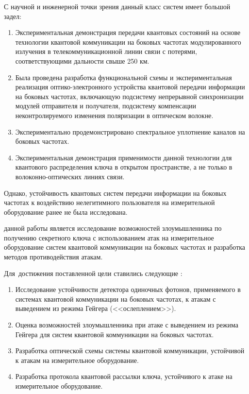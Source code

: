 С научной и инженерной точки зрения данный класс систем имеет большой задел:

\begin{enumerate}
	\item Экспериментальная демонстрация передачи квантовых состояний на основе технологии квантовой коммуникации на боковых частотах модулированного излучения в телекоммуникационной линии связи с потерями, соответствующими дальности свыше 250 км. 
	\item Была проведена разработка функциональной схемы и экспериментальная реализация оптико-электронного устройства квантовой передачи информации на боковых частотах, включающую подсистему непрерывной синхронизации модулей отправителя и получателя, подсистему компенсации неконтролируемого изменения поляризации в оптическом волокне.
	\item Экспериментально продемонстрировано спектральное уплотнение каналов на боковых частотах. 
	\item Экспериментальная демонстрация применимости данной технологии для квантового распределения ключа в открытом пространстве, а не только в волоконно-оптических линиях связи. 
\end{enumerate}


Однако, устойчивость квантовых систем передачи информации на боковых частотах к воздействию нелегитимного пользователя на измерительной оборудование ранее не была исследована. 


{\aim} данной работы является исследование возможностей злоумышленника по получению секретного ключа с использованием атак на измерительное оборудование систем квантовой коммуникации на боковых частотах и разработка методов противодействия атакам.


Для~достижения поставленной цели ставились следующие {\tasks}:
\begin{enumerate}
  \item Исследование устойчивости детектора одиночных фотонов, применяемого в системах квантовой коммуникации на боковых частотах, к атакам с выведением из режима Гейгера (<<ослеплением>>). 

  \item Оценка возможностей злоумышленника при атаке с выведением из режима Гейгера для систем квантовой коммуникации на боковых частотах. 

  \item Разработка оптической схемы системы квантовой коммуникации, устойчивой к атакам на измерительное оборудование. 

  \item Разработка протокола квантовой рассылки ключа, устойчивого к атаке на измерительное оборудование. 

\end{enumerate}
